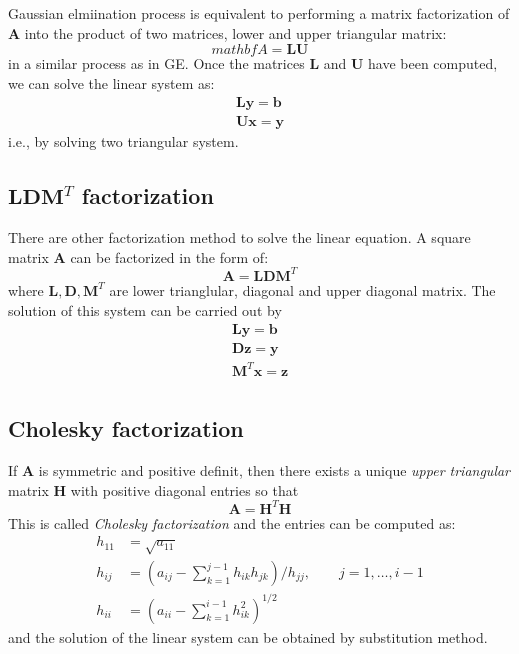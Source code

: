 \documentclass{article}
\begin{document}
Gaussian elmiination process is equivalent to performing a matrix factorization of $\mathbf{A}$
into the product of two matrices, lower and upper triangular matrix:
\begin{equation}
    \label{LU}
    mathbf{A} = \mathbf{L} \mathbf{U}
\end{equation}
in a similar process as in GE. 
Once the matrices $\mathbf{L}$ and $\mathbf{U}$ have been computed, we can solve the linear 
system as:
\begin{align*}
    \mathbf{L}\mathbf{y} = \mathbf{b} \\
    \mathbf{U}\mathbf{x} = \mathbf{y}
\end{align*}
i.e., by solving two triangular system.

\subsection{$\mathbf{L} \mathbf{D} \mathbf{M}^T$ factorization}
There are other factorization method to solve the linear equation.
A square matrix $\mathbf{A}$ can be factorized in the form of:
\begin{equation}
    \mathbf{A} = \mathbf{L} \mathbf{D} \mathbf{M}^T
\end{equation}
where $\mathbf{L}, \mathbf{D}, \mathbf{M}^T$ are lower trianglular, diagonal and 
upper diagonal matrix. The solution of this system can be carried out by 
\begin{align*}
    \mathbf{L}  \mathbf{y} = \mathbf{b} \\
    \mathbf{D}  \mathbf{z} = \mathbf{y} \\
    \mathbf{M}^T\mathbf{x} = \mathbf{z} \\
\end{align*}

\subsection{Cholesky factorization}
If $\mathbf{A}$ is symmetric and positive definit, then there exists a unique 
\emph{upper triangular} matrix $\mathbf{H}$ with positive diagonal entries so 
that 
\begin{equation}
    \mathbf{A} = \mathbf{H}^T \mathbf{H}
\end{equation}
This is called \emph{Cholesky factorization} and the entries can be computed as:
\begin{align*}
    h_{11} &= \sqrt{a_{11}} \\
    h_{ij} &= \left( a_{ij} - \sum_{k=1}^{j-1} h_{ik}h_{jk} \right) / h_{jj}, \qquad j = 1,\dots,i-1 \\
    h_{ii} &= \left( a_{ii} - \sum_{k=1}^{i-1} h_{ik}^2 \right)^{1/2}
\end{align*}
and the solution of the linear system can be obtained by substitution method.
\end{document}
